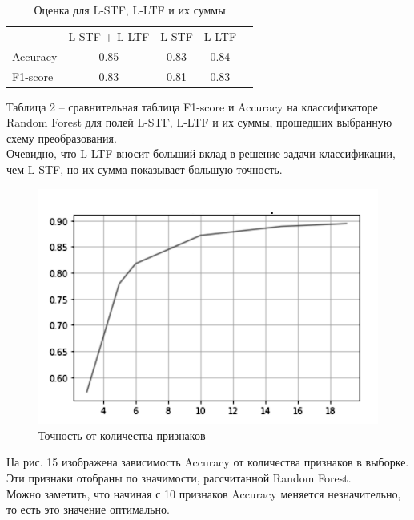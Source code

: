        \begin{table}[h!]
            \begin{tabular}{l|c|c|c|l}
                \cline{2-4}
                                               & L-STF + L-LTF & L-STF & L-LTF &  \\
                                               \cline{1-4}
                \multicolumn{1}{|l|}{Accuracy} & 0.85          & 0.83  & 0.84  &  \\ \cline{1-4}
                \multicolumn{1}{|l|}{F1-score} & 0.83          & 0.81  & 0.83  &  \\ \cline{1-4}
            \end{tabular}
            \caption{Оценка для L-STF, L-LTF и их суммы}
            \label{tab:my-table}
        \end{table}
        
        Таблица 2 – сравнительная таблица F1-score и Accuracy на классификаторе Random Forest для полей L-STF, L-LTF и их суммы, прошедших выбранную схему преобразования.\\ Очевидно, что L-LTF вносит больший вклад в решение задачи классификации, чем L-STF, но их сумма показывает большую точность.
        
        \begin{figure}[h!]
            \centering
            \includegraphics[scale=1]{pictures/acc_nf.png}
            \caption{Точность от количества признаков
            }
            \label{fig:my_label}
        \end{figure} 
        
        На рис. 15 изображена зависимость Accuracy от количества признаков в выборке. Эти признаки отобраны по значимости, рассчитанной Random Forest. \\Можно заметить, что начиная с 10 признаков Accuracy меняется незначительно, то есть это значение оптимально.
        

